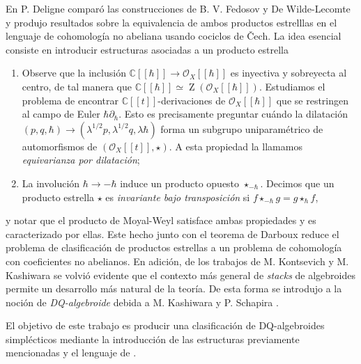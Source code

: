 En \cite{deligne-deformations} P. Deligne comparó las construcciones de B. V. Fedosov y De Wilde-Lecomte y produjo resultados sobre la equivalencia de ambos productos estrelllas en el lenguaje de cohomología no abeliana usando cociclos de Čech. La idea esencial consiste en introducir estructuras asociadas a un producto estrella
\begin{enumerate}[label = (\roman*)]
	\item Observe que la inclusión $\mathbb{C}[[\hbar]] \to \mathscr{O}_X[[\hbar]]$ es inyectiva y sobreyecta al centro, de tal manera que $\mathbb{C}[[\hbar]] \simeq \operatorname{Z}(\mathscr{O}_X[[\hbar]])$. Estudiamos el problema de encontrar $\mathbb{C}[[t]]$-derivaciones de $\mathscr{O}_X[[\hbar]]$ que se restringen al campo de Euler $\hbar\partial_\hbar$. Esto es precisamente preguntar cuándo la dilatación $(p,q,\hbar) \to (\lambda^{1/2}p, \lambda^{1/2}q, \lambda \hbar)$ forma un subgrupo uniparamétrico de automorfismos de $(\mathscr{O}_X[[t]],\star)$. A esta propiedad la llamamos \textit{equivarianza por dilatación};
	\item La involución $\hbar \to -\hbar$ induce un producto opuesto $\star_{-\hbar}$. Decimos que un producto estrella $\star$ es \textit{invariante bajo transposición} si $f \star_{-\hbar} g = g \star_{\hbar} f$,
\end{enumerate}
y notar que el producto de Moyal-Weyl satisface ambas propiedades y es caracterizado por ellas. Este hecho junto con el teorema de Darboux reduce el problema de clasificación de productos estrellas a un problema de cohomología con coeficientes no abelianos. En adición, de los trabajos de M. Kontsevich \cite{kontsevich} y M. Kashiwara \cite{Kashiwara-contact} se volvió evidente que el contexto más general de \textit{stacks} de algebroides permite un desarrollo más natural de la teoría. De esta forma se introdujo a la noción de \textit{DQ-algebroide} debida a M. Kashiwara y P. Schapira \cite{DQM}. 

El objetivo de este trabajo es producir una clasificación de DQ-algebroides simplécticos mediante la introducción de las estructuras previamente mencionadas y el lenguaje de \cite{quasi-classical}.
